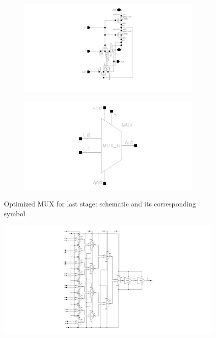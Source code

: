 \documentclass[12pt]{article}
\begin{document}
\begin{figure}[H]
    \centering
    \begin{subfigure}[b]{0.48\textwidth}
        \centering
        \includegraphics[width=\textwidth]{writeup/figures/mux_w3_opt.png}
        \caption{}
        \label{fig:mux_w3_opt}
    \end{subfigure}
    \hfill
    \begin{subfigure}[b]{0.48\textwidth}
        \centering
        \includegraphics[width=\textwidth]{writeup/figures/mux_w3_opt_sym.png}
        \caption{}
        \label{fig:mux_w3_opt_sym}
    \end{subfigure}
    \caption{Optimized MUX for last stage: schematic and its corresponding symbol}
    \label{fig:mux3_opt_comparison}
\end{figure}

\begin{figure}[H]
    \centering
    \includegraphics[width=0.8\linewidth]{writeup//figures/updated_delay_opt_LUTschem.png}
    \caption{}
\end{figure}
\end{document}
